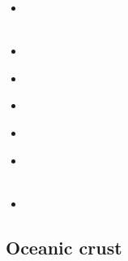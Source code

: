 \begin{scriptsize}
\begin{itemize}
\item[\nineteeneightysix] 
\textcite{chap86} \\
\textcite{bart86} \\
\item[\nineteeneightynine] 
\textcite{ord89} \\
\item[\nineteenninetyfour] 
\textcite{sawy94} \\
\item[\twothousandone] 
\textcite{dohe01} \\
\item[\twothousandfour] 
\textcite{gepm04} \\
\item[\twothousandthirteen] 
\textcite{cavg13} \\
\textcite{tibb13} \\
\item[\twothousandnineteen] 
\textcite{scmw19} 
\end{itemize}
\end{scriptsize}


\subsection{Oceanic crust} 


